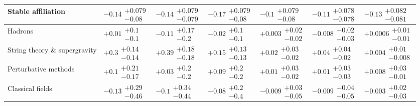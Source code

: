 \begin{table}[H]
\begin{tabular}{lllllll}
\textbf{Stable affiliation}               &   $\bm{-0.14}\substack{+0.079 \\ -0.08}$ &  $\bm{-0.14}\substack{+0.079 \\ -0.079}$ &   $\bm{-0.17}\substack{+0.079 \\ -0.08}$ &    $\bm{-0.1}\substack{+0.079 \\ -0.08}$ &  $\bm{-0.11}\substack{+0.078 \\ -0.078}$ &  $\bm{-0.13}\substack{+0.082 \\ -0.081}$ \\
\hline Hadrons                                   &           $+0.01\substack{+0.1 \\ -0.1}$ &          $-0.11\substack{+0.17 \\ -0.2}$ &           $-0.02\substack{+0.1 \\ -0.1}$ &        $+0.003\substack{+0.02 \\ -0.02}$ &        $-0.008\substack{+0.02 \\ -0.03}$ &       $+0.0006\substack{+0.01 \\ -0.01}$ \\
String theory \& supergravity             &     $\bm{+0.3}\substack{+0.14 \\ -0.14}$ &    $\bm{+0.39}\substack{+0.18 \\ -0.18}$ &    $\bm{+0.15}\substack{+0.13 \\ -0.13}$ &    $\bm{+0.02}\substack{+0.03 \\ -0.02}$ &    $\bm{+0.04}\substack{+0.04 \\ -0.02}$ &       $+0.004\substack{+0.01 \\ -0.008}$ \\
Perturbative methods                      &          $+0.1\substack{+0.21 \\ -0.17}$ &           $+0.03\substack{+0.2 \\ -0.2}$ &           $+0.09\substack{+0.2 \\ -0.2}$ &         $+0.01\substack{+0.03 \\ -0.02}$ &         $+0.01\substack{+0.03 \\ -0.03}$ &        $+0.008\substack{+0.03 \\ -0.01}$ \\
Classical fields                          &         $-0.13\substack{+0.29 \\ -0.46}$ &          $-0.1\substack{+0.34 \\ -0.44}$ &           $-0.08\substack{+0.2 \\ -0.4}$ &        $-0.009\substack{+0.03 \\ -0.05}$ &        $-0.009\substack{+0.04 \\ -0.05}$ &        $-0.003\substack{+0.02 \\ -0.03}$ \\

\end{tabular}
\end{table}

